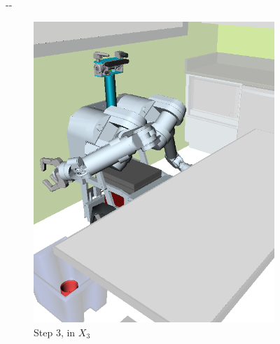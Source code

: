 \documentclass{report}
\newlength{\offsetpage}
\newenvironment{widepage}
   {\begin{adjustwidth}{-\offsetpage}{-\offsetpage}%
    \addtolength{\textwidth}{2\offsetpage}}%
{\end{adjustwidth}}
\begin{document}
\begin{figure}
\begin{widepage}
\begin{subfigure}[t]{0.185\linewidth}
\includegraphics[width=\columnwidth]{figs/testherb-d.png}
\caption{Step 3, in $X_3$}
\end{subfigure}
\begin{subfigure}[t]{0.185\linewidth}
\centering

\end{subfigure}
\end{widepage}
\end{figure}
\end{document}
